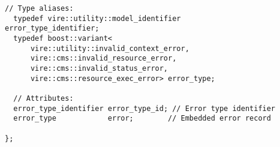 \begin{itemize}
\begin{Verbatim}[frame=single,xleftmargin=0.cm,label=\fbox{C++}]
  // Type aliases:
  typedef vire::utility::model_identifier        error_type_identifier;
  typedef boost::variant<
      vire::utility::invalid_context_error,
      vire::cms::invalid_resource_error,
      vire::cms::invalid_status_error,
      vire::cms::resource_exec_error> error_type;

  // Attributes:
  error_type_identifier error_type_id; // Error type identifier
  error_type            error;        // Embedded error record

};
\end{Verbatim}
\normalsize


\end{itemize}


\vfill
\pagebreak
\clearpage

